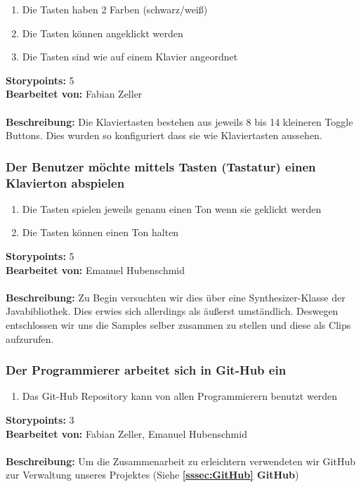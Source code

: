 \begin{enumerate}
 \item Die Tasten haben 2 Farben (schwarz/weiß)
 \item Die Tasten können angeklickt werden
 \item Die Tasten sind wie auf einem Klavier angeordnet
\end{enumerate}

\textbf{Storypoints:} 5 \\
\textbf{Bearbeitet von:} Fabian Zeller \\
\\
\textbf{Beschreibung:} Die Klaviertasten bestehen aus jeweils 8 bis 14 kleineren Toggle Buttons. Dies wurden so konfiguriert dass sie wie Klaviertasten aussehen. 


\subsubsection{Der Benutzer möchte mittels Tasten (Tastatur) einen Klavierton abspielen}

\begin{enumerate}
 \item Die Tasten spielen jeweils genanu einen Ton wenn sie geklickt werden
 \item Die Tasten können einen Ton halten
\end{enumerate}

\textbf{Storypoints:} 5 \\
\textbf{Bearbeitet von:} Emanuel Hubenschmid \\
\\
\textbf{Beschreibung:} Zu Begin versuchten wir dies über eine Synthesizer-Klasse der 
Javabibliothek. Dies erwies sich allerdings als äußerst umständlich. Deswegen entschlossen wir uns 
die Samples selber zusammen zu stellen und diese als Clips aufzurufen.


\subsubsection{Der Programmierer arbeitet sich in Git-Hub ein}

\begin{enumerate}
 \item Das Git-Hub Repository kann von allen Programmierern benutzt werden
\end{enumerate}

\textbf{Storypoints:} 3 \\
\textbf{Bearbeitet von:} Fabian Zeller, Emanuel Hubenschmid \\
\\
\textbf{Beschreibung:} Um die Zusammenarbeit zu erleichtern verwendeten wir GitHub zur Verwaltung 
unseres Projektes (Siehe \textbf{\ref{sssec:GitHub} GitHub})


